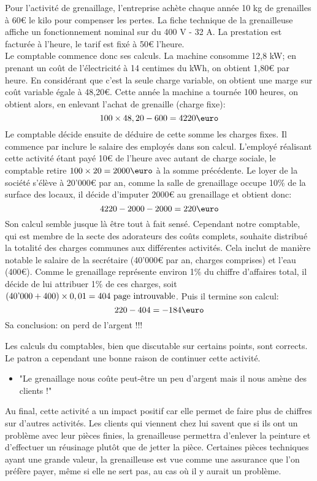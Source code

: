 Pour l'activité de grenaillage, l'entreprise achète chaque année 10 kg de grenailles 
à 60\euro\/ le kilo pour compenser les pertes. La fiche technique de la grenailleuse 
affiche un fonctionnement nominal sur du 400 V - 32 A. 
La prestation est facturée à l'heure, le tarif est fixé à 50\euro\/ l'heure. \\
Le comptable commence donc ses calculs. 
La machine consomme 12,8 kW; en prenant un coût de l'électricité à 14 centimes du kWh, 
on obtient 1,80\euro\/ par heure. En considérant que c'est la seule charge variable, 
on obtient une marge sur coût variable égale à 48,20\euro.
Cette année la machine a tournée 100 heures, on obtient alors, en enlevant l'achat de grenaille 
(charge fixe):
\[
100 \times 48,20 - 600 = 4220\text{\euro}
\]
Le comptable décide ensuite de déduire de cette somme les charges fixes. 
Il commence par inclure le salaire des employés dans son calcul. 
L'employé réalisant cette 
activité étant payé 10\euro\/ de l'heure avec autant de charge sociale, le 
comptable retire $100 \times 20 = 2000 \text{\euro}$ à la somme précédente.
Le loyer de la société s'élève à 20'000\euro\/ par an, comme la salle de 
grenaillage occupe 10\% de la surface des locaux, il décide d'imputer 2000\euro\/
au grenaillage et obtient donc:
\[
4220 - 2000 - 2000 = 220\text{\euro}
\]
Son calcul semble jusque là être tout à fait sensé. 
Cependant notre comptable, qui est membre de la secte des adorateurs des coûts complets, 
souhaite distribué la totalité des charges communes aux différentes activités.
Cela inclut de manière notable le salaire de la secrétaire (40'000\euro\/ par an, 
charges comprises) et l'eau (400\euro). Comme le grenaillage représente environ 
1\% du chiffre d'affaires total, il décide de lui attribuer 1\% de ces charges, 
soit $(40\text{'}000 + 400) \times 0,\/01 = 404 \text{ page introuvable}$.
Puis il termine son calcul:
\[
220 - 404 = -184\text{\euro}
\]
Sa conclusion: on perd de l'argent !!!

Les calculs du comptables, bien que discutable sur certains points, 
sont corrects. 
Le patron a cependant une bonne raison de continuer cette activité.
\begin{itemize}
  \item "Le grenaillage nous coûte peut-être un peu d'argent 
  mais il nous amène des clients !"
\end{itemize}
Au final, cette activité a un impact positif car elle permet 
de faire plus de chiffres sur d'autres activités. 
Les clients qui viennent chez lui savent que si ils ont un 
problème avec leur pièces finies, la grenailleuse permettra 
d'enlever la peinture et d'effectuer un réusinage plutôt que 
de jetter la pièce. Certaines pièces techniques ayant une grande 
valeur, la grenailleuse est vue comme une assurance que l'on 
préfère payer, même si elle ne sert pas,
au cas où il y aurait un problème.

